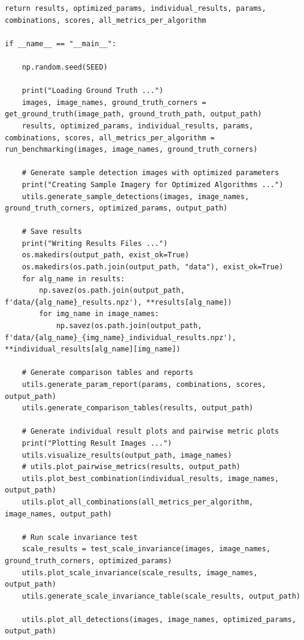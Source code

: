 \documentclass[journal]{IEEEtran}
\begin{document}
\begin{lstlisting}[style=python, caption={Driver Script for Project}, label={lst:driver}]
    return results, optimized_params, individual_results, params, combinations, scores, all_metrics_per_algorithm

if __name__ == "__main__":

    np.random.seed(SEED)
    
    print("Loading Ground Truth ...")
    images, image_names, ground_truth_corners = get_ground_truth(image_path, ground_truth_path, output_path)
    results, optimized_params, individual_results, params, combinations, scores, all_metrics_per_algorithm = run_benchmarking(images, image_names, ground_truth_corners)

    # Generate sample detection images with optimized parameters
    print("Creating Sample Imagery for Optimized Algorithms ...")
    utils.generate_sample_detections(images, image_names, ground_truth_corners, optimized_params, output_path)
    
    # Save results
    print("Writing Results Files ...")
    os.makedirs(output_path, exist_ok=True)
    os.makedirs(os.path.join(output_path, "data"), exist_ok=True)
    for alg_name in results:
        np.savez(os.path.join(output_path, f'data/{alg_name}_results.npz'), **results[alg_name])
        for img_name in image_names:
            np.savez(os.path.join(output_path, f'data/{alg_name}_{img_name}_individual_results.npz'), **individual_results[alg_name][img_name])
    
    # Generate comparison tables and reports
    utils.generate_param_report(params, combinations, scores, output_path)
    utils.generate_comparison_tables(results, output_path)
    
    # Generate individual result plots and pairwise metric plots
    print("Plotting Result Images ...")
    utils.visualize_results(output_path, image_names)
    # utils.plot_pairwise_metrics(results, output_path)
    utils.plot_best_combination(individual_results, image_names, output_path)
    utils.plot_all_combinations(all_metrics_per_algorithm, image_names, output_path)
    
    # Run scale invariance test
    scale_results = test_scale_invariance(images, image_names, ground_truth_corners, optimized_params)
    utils.plot_scale_invariance(scale_results, image_names, output_path)
    utils.generate_scale_invariance_table(scale_results, output_path)
    
    utils.plot_all_detections(images, image_names, optimized_params, output_path)
\end{lstlisting}
\bigskip
\bigskip
\end{document}
